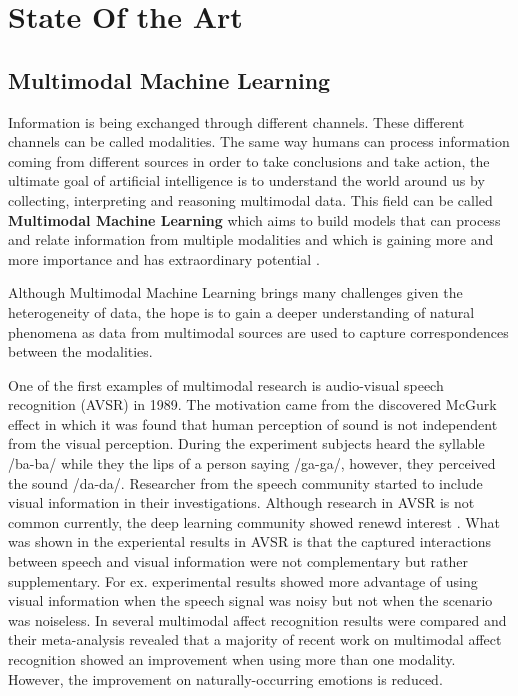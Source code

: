 \chapter{State Of the Art}
\label{cha:stateofart}


\section{Multimodal Machine Learning}

Information is being exchanged through different channels. These different channels can be called modalities. The same way humans can process information coming from different sources in order to take conclusions and take action, the ultimate goal of artificial intelligence is to understand the world around us by collecting, interpreting and reasoning multimodal data. This field can be called \textbf{Multimodal Machine Learning} which aims to build models that can process and relate information from multiple modalities and which is gaining more and more importance and has extraordinary potential \cite{Baltruvsaitis2017multimodal}.

Although Multimodal Machine Learning brings many challenges given the heterogeneity of data, the hope is to gain a deeper understanding of natural phenomena as data from multimodal sources are used to capture correspondences between the modalities.

One of the first examples of multimodal research is audio-visual speech recognition (AVSR) in 1989. The motivation came from the discovered McGurk effect in which it was found that human perception of sound is not independent from the visual perception. During the experiment subjects heard the syllable /ba-ba/ while they the lips of a person saying /ga-ga/, however, they perceived the sound /da-da/. Researcher from the speech community started to include visual information in their investigations. Although research in AVSR is not common currently, the deep learning community showed renewd interest \cite{Ngiam2011}. What was shown in the experiental results in AVSR is that the captured interactions between speech and visual information were not complementary but rather supplementary. For ex. experimental results showed more advantage of using visual information when the speech signal was noisy but not when the scenario was noiseless.
In \cite{Dmello2015review} several multimodal affect recognition results were compared and their meta-analysis revealed that a majority of recent work on multimodal affect recognition showed an improvement when using more than one modality. However, the improvement on naturally-occurring emotions is reduced. 

